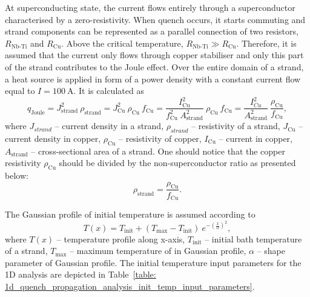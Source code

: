 At superconducting state, the current flows entirely through a superconductor characterised by a zero-resistivity. When quench occurs, it starts commuting and strand components can be represented as a parallel connection of two resistors, $R_\text{Nb-Ti}$ and $R_\text{Cu}$. Above the critical temperature, $R_\text{Nb-Ti} \gg R_\text{Cu}$. Therefore, it is assumed that the current only flows through copper stabiliser and only this part of the strand contributes to the Joule effect. Over the entire domain of a strand, a heat source is applied in form of a power density with a constant current flow equal to $I=100~\text{A}$. It is calculated as
\begin{equation}
    q_\text{Joule} = J_\text{strand}^2~\rho_\text{strand} = J_\text{Cu}^2~\rho_\text{Cu}~f_\text{Cu} = \frac{I_\text{Cu}^2}{f_\text{Cu}^2~A_\text{strand}^2}~\rho_\text{Cu}~f_\text{Cu} = \frac{I_{Cu}^2}{A_\text{strand}^2}~\frac{\rho_\text{Cu}}{f_\text{Cu}}, 
    \label{eqn: p_dens_equiv}
\end{equation}
where $J_{strand}$ -- current density in a strand, $\rho_{strand}$ -- resistivity of a strand, $J_\text{Cu}$ -- current density in copper, $\rho_\text{Cu}$ -- resistivity of copper, $I_\text{Cu}$ -- current in copper, $A_\text{strand}$ -- cross-sectional area of a strand. One should notice that the copper resistivity $\rho_\text{Cu}$ should be divided by the non-superconductor ratio as presented below: 
\begin{equation}
    \rho_\text{strand} = \frac{\rho_\text{Cu}}{f_\text{Cu}}.
    \label{eqn:strand_resistivity}
\end{equation}

The Gaussian profile of initial temperature is assumed according to 
\begin{equation}
    T(x) = T_\text{init} + (T_\text{max} - T_\text{init}) ~ e^{-(\frac{x}{\alpha})^2},
    \label{eqn: gaussian_temp_ic}
\end{equation}
where $T(x)$ -- temperature profile along x-axis, $T_\text{init}$ -- initial bath temperature of a strand, $T_\text{max}$ -- maximum temperature of in Gaussian profile, $\alpha$ -- shape parameter of Gaussian profile. The initial temperature input parameters for the 1D analysis are depicted in Table~\ref{table: 1d_quench_propagation_analysis_init_temp_input_parameters}. 

